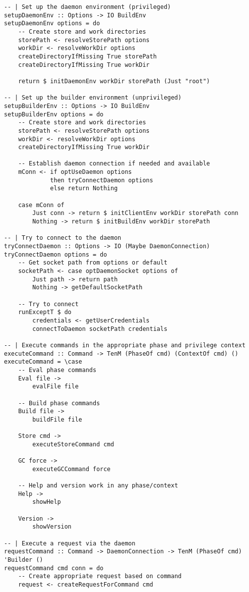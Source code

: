 \documentclass{article}
\begin{document}
\begin{tcolorbox}[title=Ten/CLI.hs Changes]
\begin{verbatim}
-- | Set up the daemon environment (privileged)
setupDaemonEnv :: Options -> IO BuildEnv
setupDaemonEnv options = do
    -- Create store and work directories
    storePath <- resolveStorePath options
    workDir <- resolveWorkDir options
    createDirectoryIfMissing True storePath
    createDirectoryIfMissing True workDir

    return $ initDaemonEnv workDir storePath (Just "root")

-- | Set up the builder environment (unprivileged)
setupBuilderEnv :: Options -> IO BuildEnv
setupBuilderEnv options = do
    -- Create store and work directories
    storePath <- resolveStorePath options
    workDir <- resolveWorkDir options
    createDirectoryIfMissing True workDir

    -- Establish daemon connection if needed and available
    mConn <- if optUseDaemon options
             then tryConnectDaemon options
             else return Nothing

    case mConn of
        Just conn -> return $ initClientEnv workDir storePath conn
        Nothing -> return $ initBuildEnv workDir storePath

-- | Try to connect to the daemon
tryConnectDaemon :: Options -> IO (Maybe DaemonConnection)
tryConnectDaemon options = do
    -- Get socket path from options or default
    socketPath <- case optDaemonSocket options of
        Just path -> return path
        Nothing -> getDefaultSocketPath

    -- Try to connect
    runExceptT $ do
        credentials <- getUserCredentials
        connectToDaemon socketPath credentials

-- | Execute commands in the appropriate phase and privilege context
executeCommand :: Command -> TenM (PhaseOf cmd) (ContextOf cmd) ()
executeCommand = \case
    -- Eval phase commands
    Eval file ->
        evalFile file

    -- Build phase commands
    Build file ->
        buildFile file

    Store cmd ->
        executeStoreCommand cmd

    GC force ->
        executeGCCommand force

    -- Help and version work in any phase/context
    Help ->
        showHelp

    Version ->
        showVersion

-- | Execute a request via the daemon
requestCommand :: Command -> DaemonConnection -> TenM (PhaseOf cmd) 'Builder ()
requestCommand cmd conn = do
    -- Create appropriate request based on command
    request <- createRequestForCommand cmd


\end{verbatim}
\end{tcolorbox}
\end{document}
